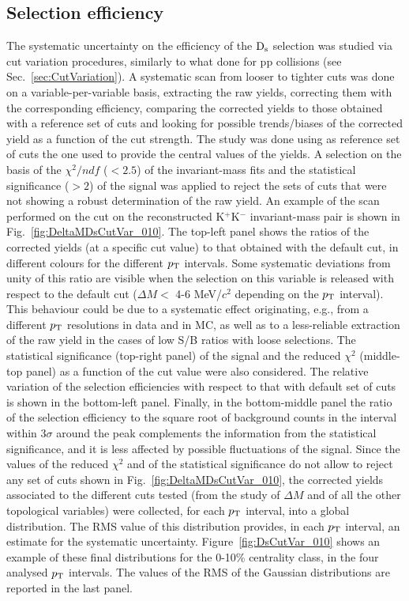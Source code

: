\subsection{Selection efficiency}
\label{sec:CutVarsystAA}
The systematic uncertainty on the efficiency of the ${\rm D_s}$ selection was studied
via cut variation procedures, similarly to what done for pp collisions (see Sec.~\ref{sec:CutVariation}).
A systematic scan from looser to tighter cuts was done on a variable-per-variable 
basis, extracting the raw yields, correcting them with the corresponding efficiency, 
comparing the corrected yields to those obtained 
with a reference set of cuts and looking for possible trends/biases of 
the corrected yield as a function of the cut strength.
The study was done using as reference set of cuts the one used 
to provide the central values of the yields. A selection
on the basis of the $\chi^2/ndf$ ($<2.5$) of the invariant-mass fits and the statistical significance ($>2$)
of the signal was applied to reject the sets of cuts that were not showing a robust 
determination of the raw yield.  
An example of the scan performed on the cut on the
reconstructed K$^+$K$^-$ invariant-mass pair is shown in Fig.~\ref{fig:DeltaMDsCutVar_010}.
The top-left panel shows the ratios of the corrected yields 
(at a specific cut value) to that obtained with the default
cut, in different colours for the different $p_{\rm T}$ intervals.
Some systematic deviations from unity of this ratio are visible when the selection
on this variable is released with respect to the default cut ($\Delta M < $ 4-6 MeV/$c^2$ depending
on the $p_{\rm T}$ interval). 
This behaviour could be due to a systematic effect originating, e.g., from a 
different $p_{\rm T}$ resolutions in data and in MC, as well as to a less-reliable extraction of 
the raw yield in the cases of low S/B ratios with loose selections.
The statistical significance (top-right panel) of the signal and
the reduced $\chi^2$ (middle-top panel) as a function of the cut value were also considered.
The relative variation of the selection
efficiencies with respect to that with default set of cuts is shown in the bottom-left panel.
Finally, in the bottom-middle panel the ratio of the selection efficiency to the square root of 
background counts in the interval within $3\sigma$ around the peak complements 
the information from the statistical significance,
and it is less affected by possible fluctuations of the signal.
Since the values of the reduced $\chi^2$ and of the statistical significance do
not allow to reject any set of cuts shown in Fig.~\ref{fig:DeltaMDsCutVar_010},
the corrected yields associated to the different cuts tested (from the study of $\Delta M$ and of all the other topological variables) were collected, for each $p_{\rm T}$ interval,
into a global distribution. 
The RMS value of this distribution provides, in each $p_{\rm T}$ interval, an estimate for the systematic uncertainty.
Figure~\ref{fig:DsCutVar_010} shows an example of these final distributions 
for the 0-10\% centrality class, in the four analysed $p_{\rm T}$ intervals. 
The values of the RMS of the Gaussian distributions are reported
in the last panel.

